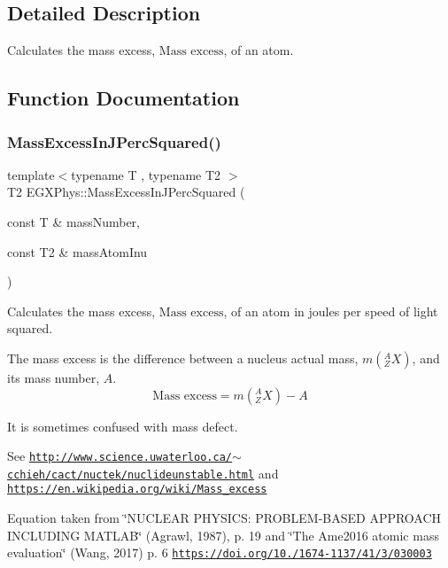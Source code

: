 \subsection{Detailed Description}
Calculates the mass excess, $\text{Mass excess}$, of an atom. 

\subsection{Function Documentation}
\mbox{\label{group___e_g_x_phys-_mass_excess_ga3eb487f438543e950b9c5aece4c5b409}} 
\subsubsection{\texorpdfstring{Mass\+Excess\+In\+J\+Perc\+Squared()}{MassExcessInJPercSquared()}}
{\footnotesize\ttfamily template$<$typename T , typename T2 $>$ \\
T2 E\+G\+X\+Phys\+::\+Mass\+Excess\+In\+J\+Perc\+Squared (\begin{DoxyParamCaption}\item[{const T \&}]{mass\+Number,  }\item[{const T2 \&}]{mass\+Atom\+Inu }\end{DoxyParamCaption})}



Calculates the mass excess, $\text{Mass excess}$, of an atom in joules per speed of light squared. 

The mass excess is the difference between a nucleus actual mass, $m({^A_ZX})$, and its mass number, $A$. \[\text{Mass excess} = m({^A_ZX}) - A\]

It is sometimes confused with mass defect.

See \href{http://www.science.uwaterloo.ca/~cchieh/cact/nuctek/nuclideunstable.html}{\tt http\+://www.\+science.\+uwaterloo.\+ca/$\sim$cchieh/cact/nuctek/nuclideunstable.\+html} and \href{https://en.wikipedia.org/wiki/Mass_excess}{\tt https\+://en.\+wikipedia.\+org/wiki/\+Mass\+\_\+excess}

Equation taken from \char`\"{}\+N\+U\+C\+L\+E\+A\+R P\+H\+Y\+S\+I\+C\+S\+: P\+R\+O\+B\+L\+E\+M-\/\+B\+A\+S\+E\+D A\+P\+P\+R\+O\+A\+C\+H I\+N\+C\+L\+U\+D\+I\+N\+G M\+A\+T\+L\+A\+B\char`\"{} (Agrawl, 1987), p. 19 and \char`\"{}\+The Ame2016 atomic mass evaluation\char`\"{} (Wang, 2017) p. 6 \href{https://doi.org/10.1088/1674-1137/41/3/030003}{\tt https\+://doi.\+org/10./1674-\/1137/41/3/030003}



